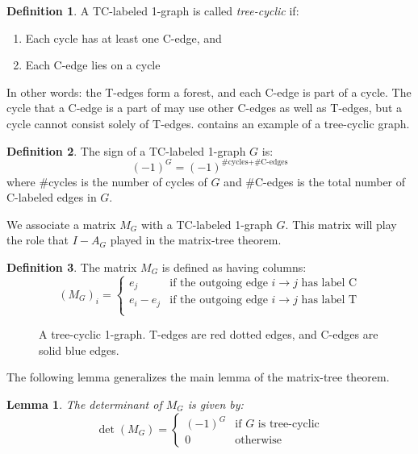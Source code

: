\documentclass[a4paper, 11pt]{article}
\newtheorem{lemma}[theorem]{Lemma}
\theoremstyle{definition}
\newtheorem{definition}{Definition}[section]
\begin{document}
\begin{definition}
  A TC-labeled 1-graph is called \emph{tree-cyclic} if:
  \begin{enumerate}
    \item Each cycle has at least one C-edge, and
    \item Each C-edge lies on a cycle
  \end{enumerate}
\end{definition}


In other words: the T-edges form a forest, and each C-edge is part of a cycle. The cycle that a C-edge is a part of may use other C-edges as well as T-edges, but a cycle cannot consist solely of T-edges.  contains an example of a tree-cyclic graph.

\begin{definition}
  The sign of a TC-labeled 1-graph $G$ is:
  \[
   (-1)^{G} = (-1)^{\text{\#cycles} + \text{\#C-edges}}
  \]
  where \#cycles is the number of cycles of $G$ and \#C-edges is the total number of C-labeled edges in $G$.
\end{definition}

We associate a matrix $M_G$ with a TC-labeled 1-graph $G$. This matrix will play the role that $I - A_G$ played in the matrix-tree theorem.

\begin{definition}
  The matrix $M_G$ is defined as having columns:
  \[
    (M_G)_i = \begin{cases}
      e_j & \text{if the outgoing edge $i \to j$ has label C} \\
      e_i - e_j & \text{if the outgoing edge $i \to j$ has label T} \\
    \end{cases}
  \]
\end{definition}

\begin{figure}
  \centering
  \begin{tikzpicture}[spring layout,node distance=30pt, random seed=1]
    
  \end{tikzpicture}
  \caption{A tree-cyclic 1-graph. T-edges are red dotted edges, and C-edges are solid blue edges.}
  \label{fig:tcgraph}
\end{figure}

The following lemma generalizes the main lemma of the matrix-tree theorem.

\begin{lemma}
  The determinant of $M_G$ is given by:
  \[
    \det(M_G) = \begin{cases}
      (-1)^G & \text{if $G$ is tree-cyclic} \\
      0 & \text{otherwise}
    \end{cases}
  \]
\end{lemma}
\end{document}
